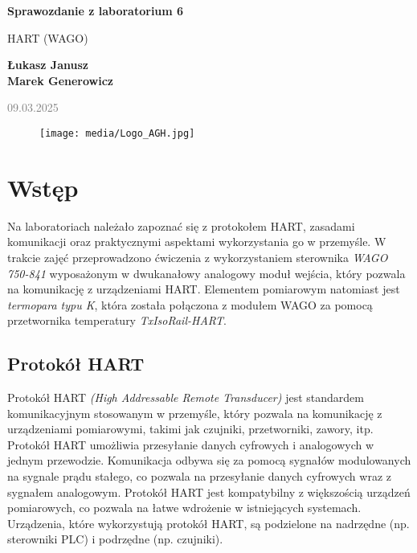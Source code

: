 \documentclass{article}
\begin{document}
\begin{titlepage}
    \begin{center}
        \vspace*{1cm}
            
        \Huge
        \textbf{Sprawozdanie z laboratorium 6}
            
        \vspace{0.5cm}
        \LARGE
        HART (WAGO)
            
        \vspace{1.5cm}
            
        \textbf{Łukasz Janusz\\Marek Generowicz}

        \normalsize      
        \textcolor{gray}{09.03.2025}
        \vfill
        \begin{figure}[hb]
            \centering
            \texttt{[image: media/Logo\_AGH.jpg]}
        \end{figure}   
    \end{center}
\end{titlepage}

\section{Wstęp}
Na laboratoriach należało zapoznać się z protokołem HART, zasadami komunikacji oraz praktycznymi aspektami wykorzystania go w przemyśle. W trakcie zajęć przeprowadzono ćwiczenia z wykorzystaniem sterownika \textit{WAGO 750-841} wyposażonym w dwukanałowy analogowy moduł wejścia, który pozwala na komunikację z urządzeniami HART. Elementem pomiarowym natomiast jest \textit{termopara typu K}, która została połączona z modułem WAGO za pomocą przetwornika temperatury \textit{TxIsoRail-HART}. 
\subsection{Protokół HART}
Protokół HART \textit{(High Addressable Remote Transducer)} jest standardem komunikacyjnym stosowanym w przemyśle, który pozwala na komunikację z urządzeniami pomiarowymi, takimi jak czujniki, przetworniki, zawory, itp. Protokół HART umożliwia przesyłanie danych cyfrowych i analogowych w jednym przewodzie. Komunikacja odbywa się za pomocą sygnałów modulowanych na sygnale prądu stałego, co pozwala na przesyłanie danych cyfrowych wraz z sygnałem analogowym. Protokół HART jest kompatybilny z większością urządzeń pomiarowych, co pozwala na łatwe wdrożenie w istniejących systemach. Urządzenia, które wykorzystują protokół HART, są podzielone na nadrzędne (np. sterowniki PLC) i podrzędne (np. czujniki).
\newpage
\end{document}
